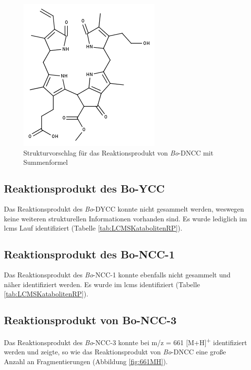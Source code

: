 \begin{figure}[!htbp]
  \centering
  \includegraphics[scale=0.6]{figures/Kapitel7/Kataboliten/fragmentation_structures/VWA_Katabolit_633.png}
  \caption[Strukturvorschlag für das Reaktionsprodukt von \textit{Bo}-DNCC, Quelle: Autor]{Strukturvorschlag für das Reaktionsprodukt von \textit{Bo}-DNCC mit Summenformel }
  \label{fig:633MStruktur}
\end{figure}

\pagebreak
\subsection{Reaktionsprodukt des Bo-YCC}

Das Reaktionsprodukt des \textit{Bo}-DYCC konnte nicht gesammelt werden, weswegen keine weiteren strukturellen Informationen vorhanden sind. Es wurde lediglich im \gls{lcms} Lauf identifiziert (Tabelle \ref{tab:LCMSKatabolitenRP}).

\subsection{Reaktionsprodukt des Bo-NCC-1}

Das Reaktionsprodukt des \textit{Bo}-NCC-1 konnte ebenfalls nicht gesammelt und näher identifiziert werden. Es wurde im \gls{lcms} identifiziert (Tabelle \ref{tab:LCMSKatabolitenRP}).

\pagebreak
\subsection{Reaktionsprodukt von Bo-NCC-3} \label{sec:ESIMSRPBoNCC3}

Das Reaktionsprodukt des \textit{Bo}-NCC-3 konnte bei m/z = 661 [M+H]\textsuperscript{+} identifiziert werden und zeigte, so wie das Reaktionsprodukt von \textit{Bo}-DNCC eine große Anzahl an Fragmentierungen (Abbildung \ref{fig:661MH}). 

